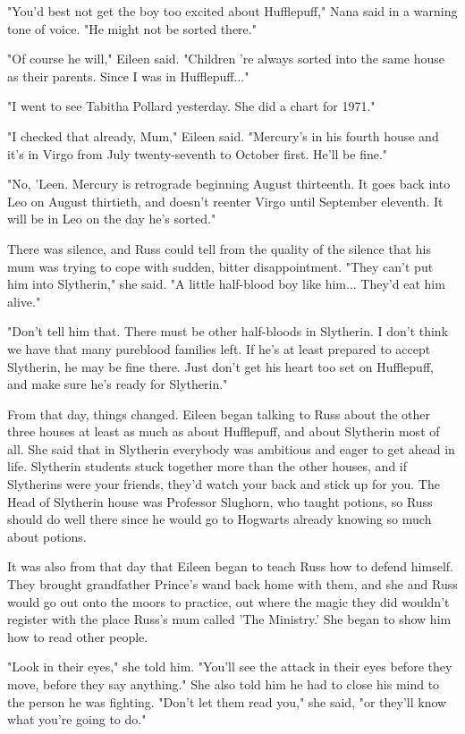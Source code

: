 \documentclass[a4paper,11pt]{article}
\begin{document}
"You'd best not get the boy too excited about Hufflepuff," Nana said in a warning tone of voice. "He might not be sorted there."

"Of course he will," Eileen said. "Children 're always sorted into the same house as their parents. Since I was in Hufflepuff..."

"I went to see Tabitha Pollard yesterday. She did a chart for 1971."

"I checked that already, Mum," Eileen said. "Mercury's in his fourth house and it's in Virgo from July twenty-seventh to October first. He'll be fine."

"No, 'Leen. Mercury is retrograde beginning August thirteenth. It goes back into Leo on August thirtieth, and doesn't reenter Virgo until September eleventh. It will be in Leo on the day he's sorted."

There was silence, and Russ could tell from the quality of the silence that his mum was trying to cope with sudden, bitter disappointment. "They can't put him into Slytherin," she said. "A little half-blood boy like him... They'd eat him alive."

"Don't tell him that. There must be other half-bloods in Slytherin. I don't think we have that many pureblood families left. If he's at least prepared to accept Slytherin, he may be fine there. Just don't get his heart too set on Hufflepuff, and make sure he's ready for Slytherin."

From that day, things changed. Eileen began talking to Russ about the other three houses at least as much as about Hufflepuff, and about Slytherin most of all. She said that in Slytherin everybody was ambitious and eager to get ahead in life. Slytherin students stuck together more than the other houses, and if Slytherins were your friends, they'd watch your back and stick up for you. The Head of Slytherin house was Professor Slughorn, who taught potions, so Russ should do well there since he would go to Hogwarts already knowing so much about potions.

It was also from that day that Eileen began to teach Russ how to defend himself. They brought grandfather Prince's wand back home with them, and she and Russ would go out onto the moors to practice, out where the magic they did wouldn't register with the place Russ's mum called 'The Ministry.' She began to show him how to read other people.

"Look in their eyes," she told him. "You'll see the attack in their eyes before they move, before they say anything." She also told him he had to close his mind to the person he was fighting. "Don't let them read you," she said, "or they'll know what you're going to do."
\end{document}
